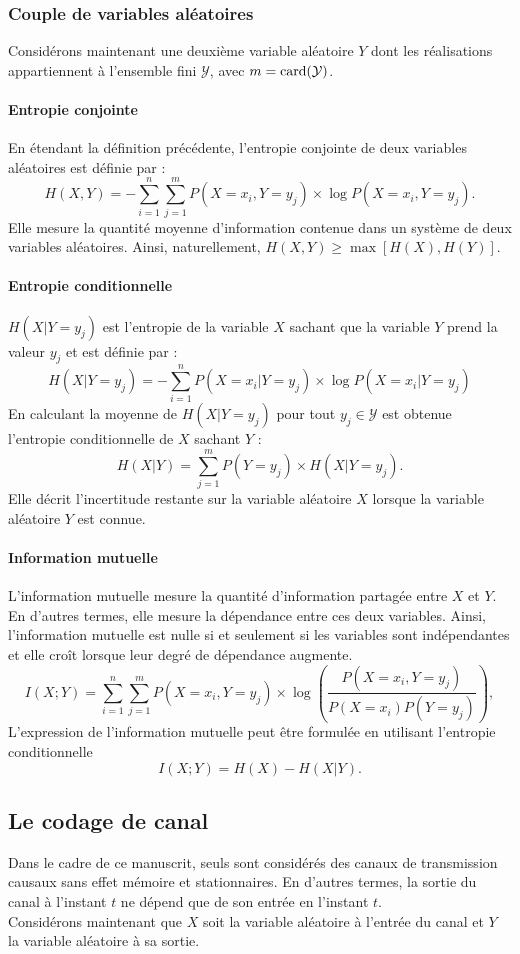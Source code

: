 \subsubsection{Couple de variables aléatoires}
Considérons maintenant une deuxième variable aléatoire $Y$ dont les réalisations appartiennent à l'ensemble fini $\mathcal{Y}$, avec 
$m=\operatorname{card}(\mathcal{Y})$.
\paragraph*{Entropie conjointe}
En étendant la définition précédente, l'entropie conjointe de deux variables aléatoires est définie par : 
\[H(X, Y) = - \sum\limits_{i=1}^n\sum\limits_{j=1}^m P(X=x_i, Y=y_j) \times \log P(X=x_i, Y=y_j).\]
Elle mesure la quantité moyenne d'information contenue dans un système de deux variables aléatoires. 
Ainsi, naturellement, $H(X, Y) \geq \max \left[H(X), H(Y)\right]$.
\paragraph*{Entropie conditionnelle} 
$H(X|Y=y_j)$ est l'entropie de la variable $X$ sachant que la variable $Y$ prend la valeur $y_j$ et est définie par :
\[H(X|Y=y_j) = - \sum \limits_{i=1}^n P(X=x_i|Y=y_j)\times \log P(X=x_i|Y=y_j)\]
En calculant la moyenne de $H(X|Y=y_j)$ pour tout $y_j\in \mathcal{Y}$ est obtenue l'entropie conditionnelle de $X$ sachant $Y$ : 
\[H(X|Y) = \sum\limits_{j=1}^m P(Y=y_j)\times H(X|Y=y_j).\] Elle décrit l'incertitude restante sur la variable aléatoire $X$ 
lorsque la variable aléatoire $Y$ est connue.
\paragraph*{Information mutuelle}
L’information mutuelle mesure la quantité d'information partagée entre $X$ et $Y$. En d'autres termes, elle mesure la 
dépendance entre ces deux variables. Ainsi, l'information mutuelle est nulle si et seulement si les variables sont 
indépendantes et elle croît lorsque leur degré de dépendance augmente.
\[I(X;Y) = \sum\limits_{i=1}^n\sum\limits_{j=1}^m P(X=x_i,Y=y_j) \times \log\left(\frac{P(X=x_i, Y=y_j)}{P(X=x_i)P(Y=y_j)}\right),\]
L'expression de l'information mutuelle peut être formulée en utilisant l'entropie conditionnelle
\begin{equation}
	I(X;Y) = H(X) - H(X|Y).
	\label{eq:imut}
\end{equation}
\subsection{Le codage de canal}
Dans le cadre de ce manuscrit, seuls sont considérés des canaux de transmission causaux sans effet mémoire et stationnaires. 
En d'autres termes, la sortie du canal à l'instant $t$ ne dépend que de son entrée en l'instant $t$.\\
Considérons maintenant que $X$ soit la variable aléatoire à l'entrée du canal et $Y$ la variable aléatoire à sa sortie.
